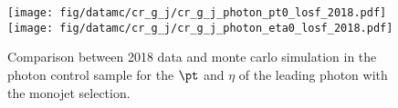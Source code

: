 \begin{figure}[htbp]
    \begin{center}
        \texttt{[image: fig/datamc/cr\_g\_j/cr\_g\_j\_photon\_pt0\_losf\_2018.pdf]}
        \texttt{[image: fig/datamc/cr\_g\_j/cr\_g\_j\_photon\_eta0\_losf\_2018.pdf]}
    \end{center}
    \caption{Comparison between 2018 data and monte carlo simulation in the photon  control sample for
        the $\pt$ and $\eta$ of the leading photon with the monojet selection.}
    \label{fig:Photon2_monojet_2018}
\end{figure}

